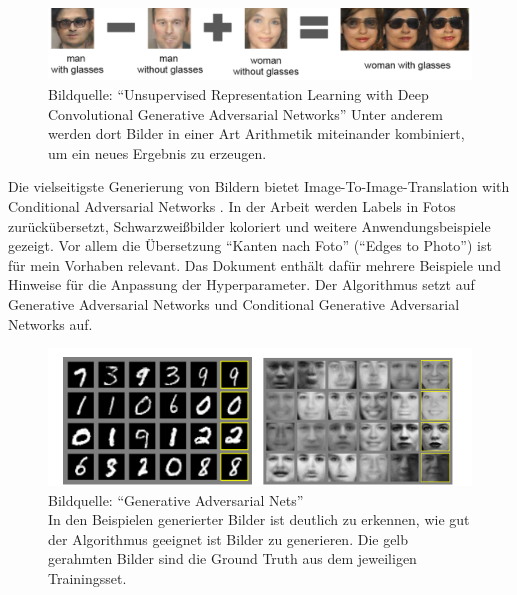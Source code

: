 \begin{figure}[h]
	\centering
	\includegraphics[width=1.0\textwidth]{bilder/image_arithmetic.png}
	\caption[Bildarithmetik]{Bildquelle: ``Unsupervised Representation Learning with Deep Convolutional Generative Adversarial Networks'' \cite{radford2016unsupervised} \newline Unter anderem werden dort Bilder in einer Art Arithmetik miteinander kombiniert, um ein neues Ergebnis zu erzeugen.}
	\label{fig:unsupervisedexamples}
\end{figure}

Die vielseitigste Generierung von Bildern bietet Image-To-Image-Translation with Conditional Adversarial Networks \cite{isola2018imagetoimage}. In der Arbeit werden Labels in Fotos zurückübersetzt, Schwarzweißbilder koloriert und weitere Anwendungsbeispiele gezeigt. Vor allem die Übersetzung ``Kanten nach Foto'' (``Edges to Photo'') ist für mein Vorhaben relevant. Das Dokument enthält dafür mehrere Beispiele und Hinweise für die Anpassung der Hyperparameter. Der Algorithmus setzt auf Generative Adversarial Networks \cite{goodfellow2014generative} und Conditional Generative Adversarial Networks \cite{mirza2014conditional} auf.

\begin{figure}[h]
	\centering
	\includegraphics[width=1.0\textwidth]{bilder/mnist_faces.png}
	\caption[GAN Beispielbilder]{Bildquelle: ``Generative Adversarial Nets'' \cite{goodfellow2014generative} \\
	In den Beispielen generierter Bilder ist deutlich zu erkennen, wie gut der Algorithmus geeignet ist Bilder zu generieren. Die gelb gerahmten Bilder sind die Ground Truth aus dem jeweiligen Trainingsset.}
	\label{fig:ganexamples}
\end{figure}

